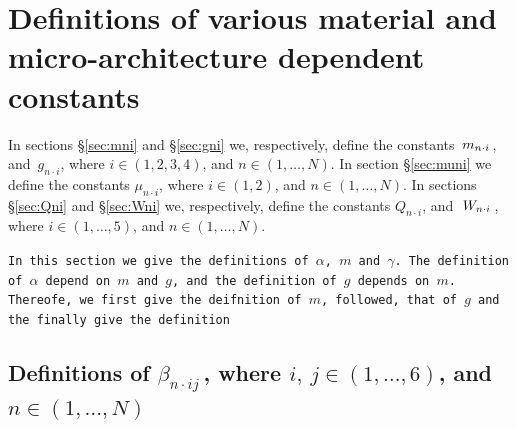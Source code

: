 \documentclass[preprint,12pt,times]{elsarticle}
\numberwithin{equation}{section}
\newcommand{\msub}[2]{
\IfEqCase{#2}{
      {i}{\, m_{#1\cdot #2}\,}%
  }[\,m_{#1\cdot {\scriptscriptstyle #2}}\,]}
\newcommand{\gsub}[2]{g_{#1\cdot #2}}
\newcommand{\Qsub}[2]{Q_{#1\cdot #2}}
\newcommand{\Wsub}[2]{
\IfEqCase{#2}{
      {i}{\, W_{#1\cdot #2}\,}%
  }[\,W_{#1\cdot {\scriptscriptstyle #2}}\,]}
\newcommand{\musub}[2]{\mu_{#1\cdot #2}}
\newcommand{\insix}{\in(1,\ldots,6)}
\newcommand{\inN}{\in(1,\ldots,N)}
\renewcommand{\>}{$\Rightarrow$}
\begin{document}
\newpage
\appendix

\section{Definitions of various material and micro-architecture dependent constants}
\label{Appen:MatConst}



In sections \S\ref{sec:mni} and \S\ref{sec:gni} we, respectively, define the constants $\msub{n}{i}$, and~$\gsub{n}{i}$, where $i\in (1,2,3,4)$, and $n\in(1,\ldots,N)$. In section \S\ref{sec:muni} we define the constants $\musub{n}{i}$, where $i\in (1,2)$, and $n\in(1,\ldots,N)$. In sections \S\ref{sec:Qni} and \S\ref{sec:Wni} we, respectively, define the constants $\Qsub{n}{i}$, and~$\Wsub{n}{i}$, where $i\in (1,\ldots,5)$, and $n\in(1,\ldots,N)$.


\texttt{In this section we give the definitions of $\alpha$, $m$ and $\gamma$. The definition of $\alpha$ depend on $m$ and $g$, and the definition of $g$ depends on $m$. Thereofe, we first give the deifnition of $m$, followed, that of $g$ and the finally give the definition}


\subsection{Definitions of  $\beta_{n\cdot i j}\,$, where $i,~j\insix$, and $n\inN$\label{sec:betaCnij}}




\end{document}
